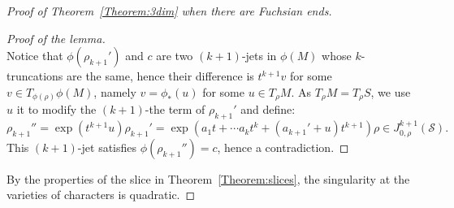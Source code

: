\documentclass[a4paper,11pt]{article}
\begin{document}
\begin{proof}[Proof of Theorem~\ref{Theorem:3dim}
 when there are Fuchsian ends]
\begin{proof}[Proof of the lemma]
$$$$
% 
Notice that $\phi(\rho_{k+1}')$ and $c$ are two $(k+1)$-jets
in $\phi(M)$
whose $k$-truncations
are the same, hence their difference is $t^{k+1} v$ for some $v\in T_ {\phi(\rho)}\phi(M)$, namely 
$v=\phi_*(u)$ for some $u\in T_\rho M$. As $T_\rho M=T_\rho S$, we use $u$ it to modify the 
$(k+1)$-the term of $\rho_{k+1}'$ and define:
$$
\rho_{k+1}''=\exp(t^{k+1} u)\rho_{k+1}'=\exp(a_1 t+\cdots a_k t^k+(a_{k+1}'+u) t^{k+1})\rho \in J^{k+1}_{0,\rho} (\mathcal{S}) .
$$
This $(k+1)$-jet satisfies $\phi( \rho_{k+1}'')= c$, hence a contradiction.
\end{proof}




By the properties of the slice in Theorem~\ref{Theorem:slices}, the singularity at the varieties of characters is quadratic. 
\end{proof}
\end{document}
